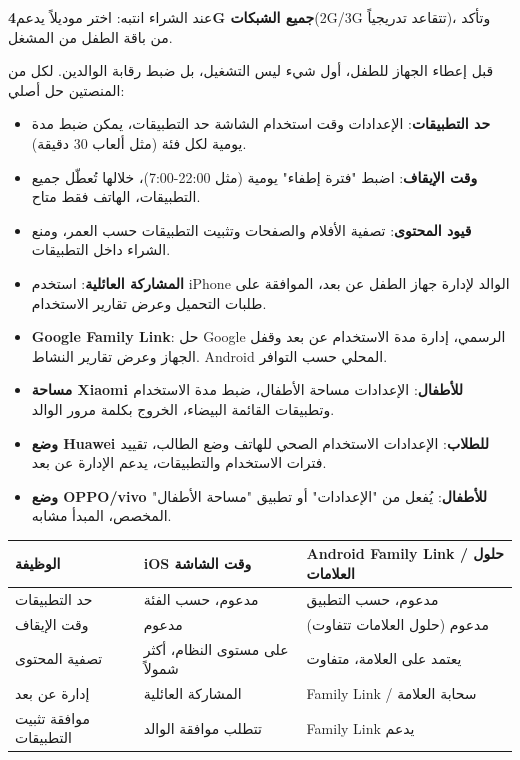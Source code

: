 عند الشراء انتبه: اختر موديلاً يدعم\textbf{4G جميع الشبكات}(2G/3G تتقاعد تدريجياً)، وتأكد من باقة الطفل من المشغل.


قبل إعطاء الجهاز للطفل، أول شيء ليس التشغيل، بل ضبط رقابة الوالدين. لكل من المنصتين حل أصلي:


\begin{itemize}
  \item \textbf{حد التطبيقات}: الإعدادات وقت استخدام الشاشة حد التطبيقات، يمكن ضبط مدة يومية لكل فئة (مثل ألعاب 30 دقيقة).
  \item \textbf{وقت الإيقاف}: اضبط "فترة إطفاء" يومية (مثل 22:00-7:00)، خلالها تُعطّل جميع التطبيقات، الهاتف فقط متاح.
  \item \textbf{قيود المحتوى}: تصفية الأفلام والصفحات وتثبيت التطبيقات حسب العمر، ومنع الشراء داخل التطبيقات.
  \item \textbf{المشاركة العائلية}: استخدم iPhone الوالد لإدارة جهاز الطفل عن بعد، الموافقة على طلبات التحميل وعرض تقارير الاستخدام.
\end{itemize}


\begin{itemize}
  \item \textbf{Google Family Link}: حل Google الرسمي، إدارة مدة الاستخدام عن بعد وقفل الجهاز وعرض تقارير النشاط. Android المحلي حسب التوافر.
  \item \textbf{مساحة Xiaomi للأطفال}: الإعدادات مساحة الأطفال، ضبط مدة الاستخدام وتطبيقات القائمة البيضاء، الخروج بكلمة مرور الوالد.
  \item \textbf{وضع Huawei للطلاب}: الإعدادات الاستخدام الصحي للهاتف وضع الطالب، تقييد فترات الاستخدام والتطبيقات، يدعم الإدارة عن بعد.
  \item \textbf{وضع OPPO/vivo للأطفال}: يُفعل من "الإعدادات" أو تطبيق "مساحة الأطفال" المخصص، المبدأ مشابه.
\end{itemize}

\begin{center}
\begin{tabularx}{\linewidth}{|X|X|X|}
\hline
\textbf{الوظيفة} & \textbf{iOS وقت الشاشة} & \textbf{Android Family Link / حلول العلامات} \tabularnewline
\hline
حد التطبيقات & مدعوم، حسب الفئة & مدعوم، حسب التطبيق \tabularnewline
وقت الإيقاف & مدعوم & مدعوم (حلول العلامات تتفاوت) \tabularnewline
تصفية المحتوى & على مستوى النظام، أكثر شمولاً & يعتمد على العلامة، متفاوت \tabularnewline
إدارة عن بعد & المشاركة العائلية & Family Link / سحابة العلامة \tabularnewline
موافقة تثبيت التطبيقات & تتطلب موافقة الوالد & Family Link يدعم \tabularnewline
\hline
\end{tabularx}
\end{center}

